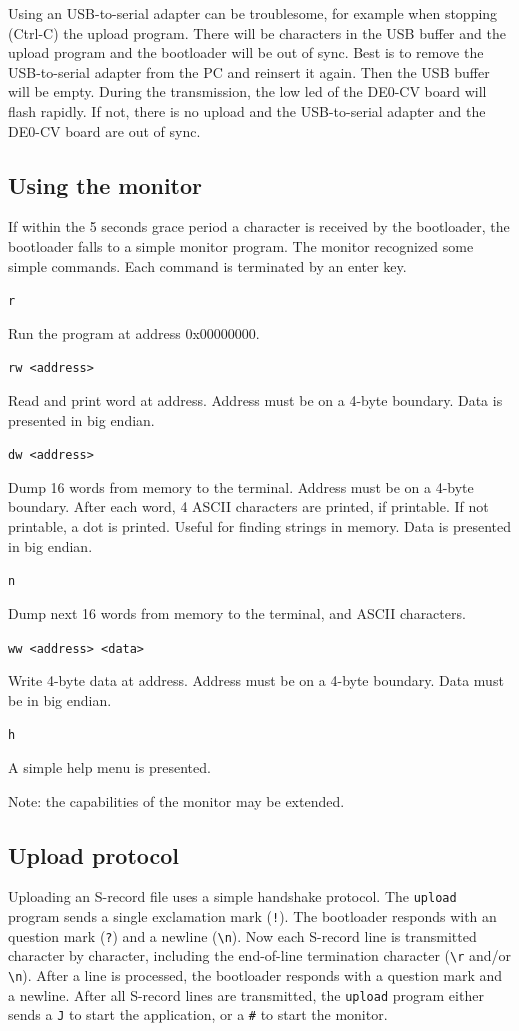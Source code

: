 \documentclass[12pt]{article}
\begin{document}
Using an USB-to-serial adapter can be troublesome, for example when stopping (Ctrl-C) the upload program. There will be characters in the USB buffer and the upload program and the bootloader will be out of sync. Best is to remove the USB-to-serial adapter from the PC and reinsert it again. Then the USB buffer will be empty. During the transmission, the low led of the DE0-CV board will flash rapidly. If not, there is no upload and the USB-to-serial adapter and the DE0-CV board are out of sync.

\subsection{Using the monitor}
If within the 5 seconds grace period a character is received by the bootloader, the bootloader falls to a simple monitor program. The monitor recognized some simple commands. Each command is terminated by an enter key.

\lstinline|r|

Run the program at address 0x00000000.

\lstinline|rw <address>|

Read and print word at address. Address must be on a 4-byte boundary. Data is presented in big endian.

\lstinline|dw <address>|

Dump 16 words from memory to the terminal. Address must be on a 4-byte boundary. After each word, 4 ASCII characters are printed, if printable. If not printable, a dot is printed. Useful for finding strings in memory. Data is presented in big endian.

\lstinline|n|

Dump next 16 words from memory to the terminal, and ASCII characters.

\lstinline|ww <address> <data>|

Write 4-byte data at address. Address must be on a 4-byte boundary. Data must be in big endian.

\lstinline|h|

A simple help menu is presented.

Note: the capabilities of the monitor may be extended.

\subsection{Upload protocol}
Uploading an S-record file uses a simple handshake protocol. The \lstinline|upload| program sends a single exclamation mark (\lstinline|!|). The bootloader responds with an question mark (\lstinline|?|) and a newline (\lstinline|\n|). Now each S-record line is transmitted character by character, including the end-of-line termination character (\lstinline|\r| and/or \lstinline|\n|). After a line is processed, the bootloader responds with a question mark and a newline. After all S-record lines are transmitted, the \lstinline|upload| program either sends a \lstinline|J| to start the application, or a \lstinline|#| to start the monitor.
\end{document}
